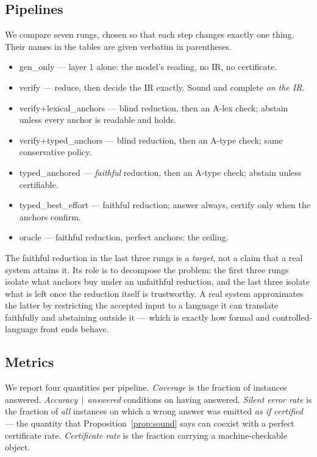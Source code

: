 \documentclass[11pt]{article}
\newcommand{\pGen}{\textsf{gen\_only}}
\newcommand{\pVerify}{\textsf{verify}}
\newcommand{\pLex}{\textsf{verify+lexical\_anchors}}
\newcommand{\pTyp}{\textsf{verify+typed\_anchors}}
\newcommand{\pTypAnch}{\textsf{typed\_anchored}}
\newcommand{\pTypBest}{\textsf{typed\_best\_effort}}
\newcommand{\pOracle}{\textsf{oracle}}
\newcommand{\Alex}{\textsf{A-lex}}
\newcommand{\Atype}{\textsf{A-type}}
\theoremstyle{definition}
\begin{document}
\subsection{Pipelines}
\label{sec:pipelines}

We compare seven rungs, chosen so that each step changes exactly one thing. Their
names in the tables are given verbatim in parentheses.

\begin{itemize}
  \item \pGen{} --- layer 1 alone: the model's reading, no IR, no certificate.
  \item \pVerify{} --- reduce, then decide the IR exactly. Sound and complete
        \emph{on the IR}.
  \item \pLex{} --- blind reduction, then an \Alex{} check; abstain unless every
        anchor is readable and holds.
  \item \pTyp{} --- blind reduction, then an \Atype{} check; same conservative
        policy.
  \item \pTypAnch{} --- \emph{faithful} reduction, then an \Atype{} check;
        abstain unless certifiable.
  \item \pTypBest{} --- faithful reduction; answer always, certify only when the
        anchors confirm.
  \item \pOracle{} --- faithful reduction, perfect anchors: the ceiling.
\end{itemize}

The faithful reduction in the last three rungs is a \emph{target}, not a claim
that a real system attains it. Its role is to decompose the problem: the first
three rungs isolate what anchors buy under an unfaithful reduction, and the last
three isolate what is left once the reduction itself is trustworthy. A real
system approximates the latter by restricting the accepted input to a language it
can translate faithfully and abstaining outside it --- which is exactly how formal
and controlled-language front ends behave.

\subsection{Metrics}
\label{sec:metrics}

We report four quantities per pipeline. \emph{Coverage} is the fraction of
instances answered. \emph{Accuracy}$\,\mid\,$\emph{answered} conditions on having
answered. \emph{Silent error rate} is the fraction of \emph{all} instances on
which a wrong answer was emitted \emph{as if certified} --- the quantity that
Proposition~\ref{prop:sound} says can coexist with a perfect certificate rate.
\emph{Certificate rate} is the fraction carrying a machine-checkable object.
\end{document}
